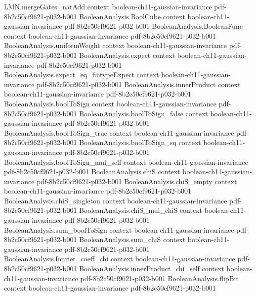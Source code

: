 \begin{theorem}
\proofstep
  {LMN.mergeGates_natAdd}
  {context}
  {boolean-ch11-gaussian-invariance}
  {pdf-8b2c50cf9621-p032-b001}
\proofstep
  {BooleanAnalysis.BoolCube}
  {context}
  {boolean-ch11-gaussian-invariance}
  {pdf-8b2c50cf9621-p032-b001}
\proofstep
  {BooleanAnalysis.BooleanFunc}
  {context}
  {boolean-ch11-gaussian-invariance}
  {pdf-8b2c50cf9621-p032-b001}
\proofstep
  {BooleanAnalysis.uniformWeight}
  {context}
  {boolean-ch11-gaussian-invariance}
  {pdf-8b2c50cf9621-p032-b001}
\proofstep
  {BooleanAnalysis.expect}
  {context}
  {boolean-ch11-gaussian-invariance}
  {pdf-8b2c50cf9621-p032-b001}
\proofstep
  {BooleanAnalysis.expect_eq_fintypeExpect}
  {context}
  {boolean-ch11-gaussian-invariance}
  {pdf-8b2c50cf9621-p032-b001}
\proofstep
  {BooleanAnalysis.innerProduct}
  {context}
  {boolean-ch11-gaussian-invariance}
  {pdf-8b2c50cf9621-p032-b001}
\proofstep
  {BooleanAnalysis.boolToSign}
  {context}
  {boolean-ch11-gaussian-invariance}
  {pdf-8b2c50cf9621-p032-b001}
\proofstep
  {BooleanAnalysis.boolToSign_false}
  {context}
  {boolean-ch11-gaussian-invariance}
  {pdf-8b2c50cf9621-p032-b001}
\proofstep
  {BooleanAnalysis.boolToSign_true}
  {context}
  {boolean-ch11-gaussian-invariance}
  {pdf-8b2c50cf9621-p032-b001}
\proofstep
  {BooleanAnalysis.boolToSign_sq}
  {context}
  {boolean-ch11-gaussian-invariance}
  {pdf-8b2c50cf9621-p032-b001}
\proofstep
  {BooleanAnalysis.boolToSign_mul_self}
  {context}
  {boolean-ch11-gaussian-invariance}
  {pdf-8b2c50cf9621-p032-b001}
\proofstep
  {BooleanAnalysis.chiS}
  {context}
  {boolean-ch11-gaussian-invariance}
  {pdf-8b2c50cf9621-p032-b001}
\proofstep
  {BooleanAnalysis.chiS_empty}
  {context}
  {boolean-ch11-gaussian-invariance}
  {pdf-8b2c50cf9621-p032-b001}
\proofstep
  {BooleanAnalysis.chiS_singleton}
  {context}
  {boolean-ch11-gaussian-invariance}
  {pdf-8b2c50cf9621-p032-b001}
\proofstep
  {BooleanAnalysis.chiS_mul_chiS}
  {context}
  {boolean-ch11-gaussian-invariance}
  {pdf-8b2c50cf9621-p032-b001}
\proofstep
  {BooleanAnalysis.sum_boolToSign}
  {context}
  {boolean-ch11-gaussian-invariance}
  {pdf-8b2c50cf9621-p032-b001}
\proofstep
  {BooleanAnalysis.sum_chiS}
  {context}
  {boolean-ch11-gaussian-invariance}
  {pdf-8b2c50cf9621-p032-b001}
\proofstep
  {BooleanAnalysis.fourier_coeff_chi}
  {context}
  {boolean-ch11-gaussian-invariance}
  {pdf-8b2c50cf9621-p032-b001}
\proofstep
  {BooleanAnalysis.innerProduct_chi_self}
  {context}
  {boolean-ch11-gaussian-invariance}
  {pdf-8b2c50cf9621-p032-b001}
\proofstep
  {BooleanAnalysis.flipBit}
  {context}
  {boolean-ch11-gaussian-invariance}
  {pdf-8b2c50cf9621-p032-b001}

\end{theorem}

